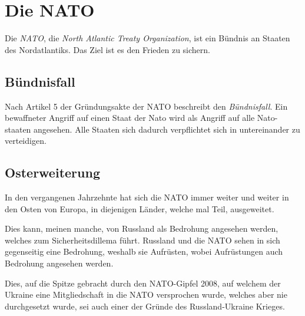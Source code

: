 \documentclass{article}
\begin{document}
\section{Die NATO}
Die \emph{NATO}, die \emph{North Atlantic Treaty Organization}, ist ein Bündnis an Staaten des Nordatlantiks. Das Ziel ist es den Frieden zu sichern.
 
\subsection{Bündnisfall}
Nach Artikel 5 der Gründungsakte der NATO beschreibt den \emph{Bündnisfall}. Ein bewaffneter Angriff auf einen Staat der Nato wird als Angriff auf alle Nato-staaten angesehen. Alle Staaten sich dadurch verpflichtet sich in untereinander zu verteidigen. 
 
\subsection{Osterweiterung}
In den vergangenen Jahrzehnte hat sich die NATO immer weiter und weiter in den Osten von Europa, in diejenigen Länder, welche mal Teil, ausgeweitet.
 
Dies kann, meinen manche, von Russland als Bedrohung angesehen werden, welches zum Sicherheitsdillema führt. Russland und die NATO sehen in sich gegenseitig eine Bedrohung, weshalb sie Aufrüsten, wobei Aufrüstungen auch Bedrohung angesehen werden.
 
Dies, auf die Spitze gebracht durch den NATO-Gipfel 2008, auf welchem der Ukraine eine Mitgliedschaft in die NATO versprochen wurde, welches aber nie durchgesetzt wurde, sei auch einer der Gründe des Russland-Ukraine Krieges.  
 
\end{document}

